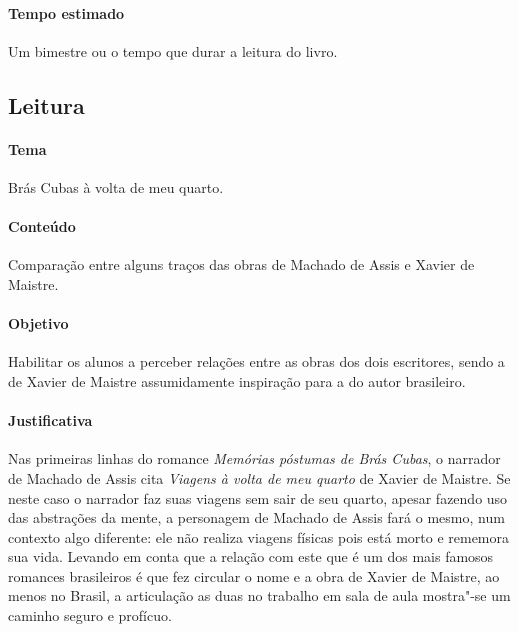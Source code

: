 \documentclass[12pt]{extarticle}
\begin{document}
\paragraph{Tempo estimado} Um bimestre ou o tempo que durar a leitura do livro.



\subsection{Leitura}

\paragraph{Tema} Brás Cubas à volta de meu quarto.

\paragraph{Conteúdo} Comparação entre alguns traços das obras de Machado de Assis e 
Xavier de Maistre.

\paragraph{Objetivo} Habilitar os alunos a perceber relações entre as obras dos 
dois escritores, sendo a de Xavier de Maistre assumidamente inspiração
para a do autor brasileiro.

\paragraph{Justificativa} Nas primeiras linhas do romance \emph{Memórias póstumas de Brás Cubas},
o narrador de Machado de Assis cita \emph{Viagens à volta de meu quarto} de Xavier de Maistre.
Se neste caso o narrador faz suas viagens sem sair de seu quarto, apesar fazendo uso das
abstrações da mente, a personagem de Machado de Assis fará o mesmo, num contexto
algo diferente: ele não realiza viagens físicas pois está morto e 
rememora sua vida. 
Levando em conta que a relação com este que é um dos mais famosos
romances brasileiros é que fez circular o nome e a obra de Xavier de Maistre, 
ao menos no Brasil, a articulação as duas no trabalho em sala de aula 
mostra"-se um caminho seguro e profícuo.
\end{document}
